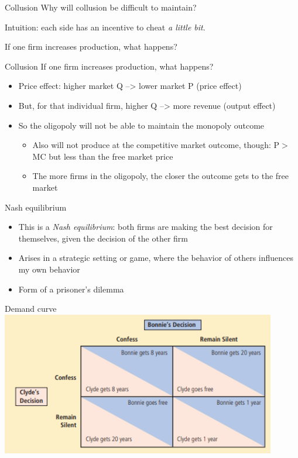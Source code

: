 \documentclass[aspectratio=169]{beamer}
\begin{document}
\begin{frame}{Collusion}
    Why will collusion be difficult to maintain? 

    \vspace{2mm}

    Intuition: each side has an incentive to cheat \textit{a little bit}.

    \vspace{2mm}

    If one firm increases production, what happens?
\end{frame}

\begin{frame}{Collusion}
    If one firm increases production, what happens?
    \begin{itemize}
        \item Price effect: higher market Q --> lower market P (price effect)
        \item But, for that individual firm, higher Q --> more revenue (output effect)
        \item So the oligopoly will not be able to maintain the monopoly outcome
        \begin{itemize}
            \item Also will not produce at the competitive market outcome, though: P$>$ MC but less than the free market price
            \item The more firms in the oligopoly, the closer the outcome gets to the free market
        \end{itemize}
    \end{itemize}
\end{frame}

\begin{frame}{Nash equilibrium}
    \begin{itemize}
        \item This is a \textit{Nash equilibrium}: both firms are making the best decision for themselves, given the decision of the other firm
        \item Arises in a strategic setting or game, where the behavior of others influences my own behavior
        \item Form of a prisoner's dilemma
    \end{itemize}
\end{frame}

\begin{frame}{Demand curve}
    \centering
    \includegraphics[width = 0.9\textwidth,keepaspectratio]{../figs/prisoners.png}
\end{frame}
\end{document}
